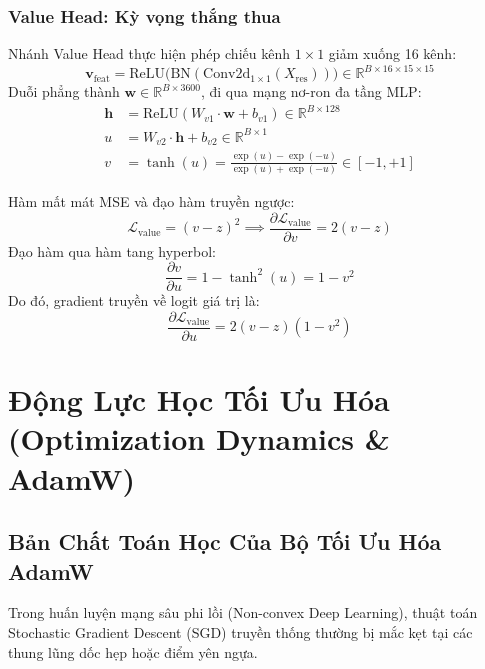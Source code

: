 \documentclass[11pt,a4paper]{report}
\begin{document}
\subsection{Value Head: Kỳ vọng thắng thua}
Nhánh Value Head thực hiện phép chiếu kênh $1 \times 1$ giảm xuống 16 kênh:
\begin{equation}
    \mathbf{v}_{\text{feat}} = \text{ReLU}\big(\text{BN}(\text{Conv2d}_{1\times 1}(X_{\text{res}}))\big) \in \mathbb{R}^{B \times 16 \times 15 \times 15}
\end{equation}
Duỗi phẳng thành $\mathbf{w} \in \mathbb{R}^{B \times 3600}$, đi qua mạng nơ-ron đa tầng MLP:
\begin{align}
    \mathbf{h} &= \text{ReLU}(W_{v1} \cdot \mathbf{w} + b_{v1}) \in \mathbb{R}^{B \times 128} \\
    u &= W_{v2} \cdot \mathbf{h} + b_{v2} \in \mathbb{R}^{B \times 1} \\
    v &= \tanh(u) = \frac{\exp(u) - \exp(-u)}{\exp(u) + \exp(-u)} \in [-1, +1]
\end{align}

Hàm mất mát MSE và đạo hàm truyền ngược:
\begin{equation}
    \mathcal{L}_{\text{value}} = (v - z)^2 \implies \frac{\partial \mathcal{L}_{\text{value}}}{\partial v} = 2(v - z)
\end{equation}
Đạo hàm qua hàm tang hyperbol:
\begin{equation}
    \frac{\partial v}{\partial u} = 1 - \tanh^2(u) = 1 - v^2
\end{equation}
Do đó, gradient truyền về logit giá trị là:
\begin{equation}
    \frac{\partial \mathcal{L}_{\text{value}}}{\partial u} = 2(v - z)(1 - v^2)
\end{equation}

\chapter{Động Lực Học Tối Ưu Hóa (Optimization Dynamics \& AdamW)}

\section{Bản Chất Toán Học Của Bộ Tối Ưu Hóa AdamW}

Trong huấn luyện mạng sâu phi lồi (Non-convex Deep Learning), thuật toán Stochastic Gradient Descent (SGD) truyền thống thường bị mắc kẹt tại các thung lũng dốc hẹp hoặc điểm yên ngựa.
\end{document}
